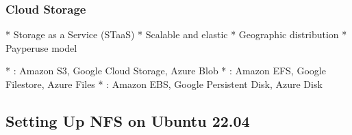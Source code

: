 \documentclass[letterpaper,10pt,english]{sphinxmanual}
\begin{document}
\subsubsection{Cloud Storage}
\label{\detokenize{network-storage:cloud-storage}}
\sphinxAtStartPar
{}
* Storage as a Service (STaaS)
* Scalable and elastic
* Geographic distribution
* Pay\sphinxhyphen{}per\sphinxhyphen{}use model

\sphinxAtStartPar
{}
* : Amazon S3, Google Cloud Storage, Azure Blob
* : Amazon EFS, Google Filestore, Azure Files
* : Amazon EBS, Google Persistent Disk, Azure Disk


\subsection{Setting Up NFS on Ubuntu 22.04}
\label{\detokenize{network-storage:setting-up-nfs-on-ubuntu-22-04}}
\end{document}
